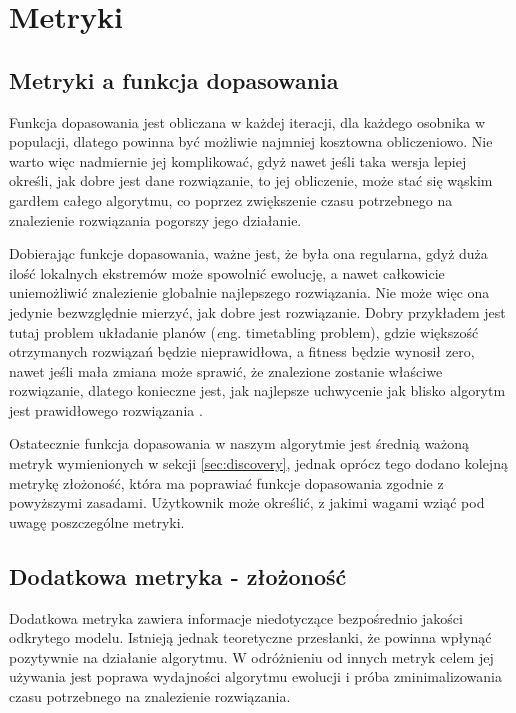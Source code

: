 \section{Metryki}
\label{sec:metryki}

\subsection{Metryki a funkcja dopasowania}

Funkcja dopasowania jest obliczana w każdej iteracji, dla każdego osobnika w populacji, dlatego powinna być możliwie najmniej kosztowna obliczeniowo. Nie warto więc nadmiernie jej komplikować, gdyż nawet jeśli taka wersja lepiej określi, jak dobre jest dane rozwiązanie, to jej obliczenie, może stać się wąskim gardłem całego algorytmu, co poprzez zwiększenie czasu potrzebnego na znalezienie rozwiązania pogorszy jego działanie. 

Dobierając funkcje dopasowania, ważne jest, że była ona regularna, gdyż duża ilość lokalnych ekstremów może spowolnić ewolucję, a nawet całkowicie uniemożliwić znalezienie globalnie najlepszego rozwiązania.
Nie może więc ona jedynie bezwzględnie mierzyć, jak dobre jest rozwiązanie. Dobry przykładem jest tutaj problem układanie planów (\textit eng. timetabling problem), gdzie większość otrzymanych rozwiązań będzie nieprawidłowa, a fitness będzie wynosił zero, nawet jeśli mała zmiana może sprawić, że znalezione zostanie właściwe rozwiązanie, dlatego konieczne jest, jak najlepsze uchwycenie jak blisko algorytm jest prawidłowego rozwiązania \cite{icga85:cramer} \cite{beasley:1993:ogapf}.

Ostatecznie funkcja dopasowania w naszym algorytmie jest średnią ważoną metryk wymienionych w sekcji \ref{sec:discovery}, jednak oprócz tego dodano kolejną metrykę złożoność, która ma poprawiać funkcje dopasowania zgodnie z powyższymi zasadami. Użytkownik może określić, z jakimi wagami wziąć pod uwagę poszczególne metryki.

\subsection{Dodatkowa metryka - złożoność}
Dodatkowa metryka zawiera informacje niedotyczące bezpośrednio jakości odkrytego modelu. Istnieją jednak  teoretyczne przesłanki, że powinna wpłynąć pozytywnie na działanie algorytmu. W odróżnieniu od innych metryk celem jej używania jest poprawa wydajności algorytmu ewolucji i próba zminimalizowania czasu potrzebnego na znalezienie rozwiązania.
 
